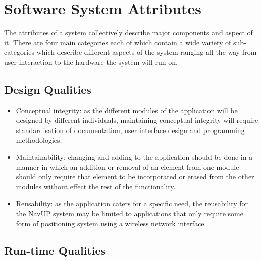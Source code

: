 \documentclass[11pt]{article}
\begin{document}
\section{Software System Attributes}

The attributes of a system collectively describe major components and aspect of it. There are four main categories each of which contain a wide variety of sub-categories which describe different aspects of the system ranging all the way from user interaction to the hardware the system will run on. 

\subsection{Design Qualities}

\begin{itemize}

\item Conceptual integrity: as the different modules of the application will be designed by different individuals, maintaining conceptual integrity will require standardisation of documentation, user interface design and programming methodologies.  	
\item Maintainability: changing and adding to the application should be 		done in a manner in which an addition or removal of an element from one 		module should only require that element to be incorporated or erased from 	the other modules without effect the rest of the functionality. 
\item Reusability: as the application caters for a specific need, the 			reusability for the NavUP system may be limited to applications that only 	require some form of positioning system using a wireless network interface. 
 
\end{itemize}

\subsection{Run-time Qualities}
\end{document}
